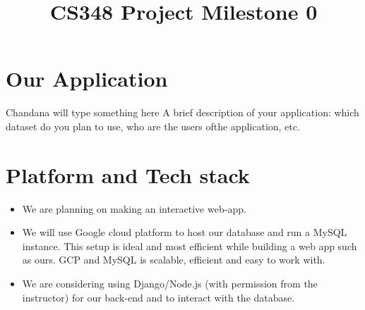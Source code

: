 \documentclass{article}
\title{CS348 Project Milestone 0}
\begin{document}
\maketitle

\section{Our Application}
Chandana will type something here
A brief description of your application: which dataset do you plan to use, who are the users ofthe application, etc.
\section{Platform and Tech stack}

\begin{itemize}


    \item  We are planning on making an interactive web-app. 

    \item We will use Google cloud platform to host our database and run a MySQL instance. This setup is ideal and most efficient while building a web app such as ours. GCP and MySQL is scalable, efficient and easy to work with.

    \item We are considering using Django/Node.js (with permission from the instructor) for our back-end and to interact with the database.
\end{itemize}
\end{document}
